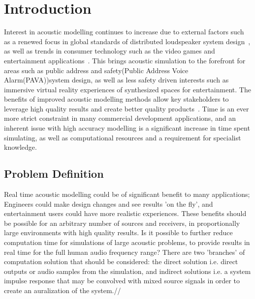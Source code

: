 \documentclass{svproc}
\begin{document}
\section{Introduction}
Interest in acoustic modelling continues to increase due to external factors such as a renewed focus in global standards of distributed loudspeaker system design~\cite{BritishStandardsInst2013}, as well as trends in consumer technology such as the video games and entertainment applications~\cite{Google2016}. This brings acoustic simulation to the forefront for areas such as public address and safety(Public Address Voice Alarm(PAVA))system design, as well as less safety driven interests such as immersive virtual reality experiences of synthesized spaces for entertainment. The benefits of improved acoustic modelling methods allow key stakeholders to leverage high quality results and create better quality products~\cite{Dod2016}. Time is an ever more strict constraint in many commercial development applications, and an inherent issue with high accuracy modelling is a significant increase in time spent simulating, as well as computational resources and a requirement for specialist knowledge.\\

\subsection{Problem Definition}
Real time acoustic modelling could be of significant benefit to many applications; Engineers could make design changes and see results 'on the fly', and entertainment users could have more realistic experiences. These benefits should be possible for an arbitrary number of sources and receivers, in proportionally large environments with high quality results. Is it possible to further reduce computation time for simulations of large acoustic problems, to provide results in real time for the full human audio frequency range? There are two 'branches' of computation solution that should be considered: the direct solution i.e. direct outputs or audio samples from the simulation, and indirect solutions i.e. a system impulse response that may be convolved with mixed source signals in order to create an auralization of the system.//


\end{document}
